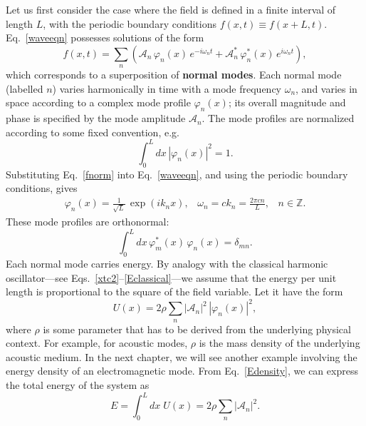 \documentclass[prx,12pt]{revtex4-2}
\begin{document}
Let us first consider the case where the field is defined in a finite
interval of length $L$, with the periodic boundary conditions $f(x,t)
\equiv f(x+L, t)$.  Eq.~\eqref{waveeqn} possesses solutions of the
form
\begin{equation}
  f(x,t) = \sum_n \left( \mathcal{A}_n\, \varphi_n(x) \, e^{-i\omega_n t}
  + \mathcal{A}_n^*\, \varphi_n^*(x) \, e^{i\omega_n t}\right),
  \label{fnorm}
\end{equation}
which corresponds to a superposition of \textbf{normal modes}.  Each
normal mode (labelled $n$) varies harmonically in time with a mode
frequency $\omega_n$, and varies in space according to a complex mode
profile $\varphi_n(x)$; its overall magnitude and phase is specified
by the mode amplitude $\mathcal{A}_n$.  The mode profiles are
normalized according to some fixed convention, e.g.
\begin{equation}
  \int_0^L dx \, |\varphi_n(x)|^2 = 1.
\end{equation}
Substituting Eq.~\eqref{fnorm} into Eq.~\eqref{waveeqn}, and using the
periodic boundary conditions, gives
\begin{align}
  \varphi_n(x) = \frac{1}{\sqrt{L}}\, \exp\left(ik_n x\right), \;\;\;
  \omega_n = c k_n = \frac{2\pi c n}{L}, \;\;\; n \in \mathbb{Z}.
  \label{classical_modes}
\end{align}
These mode profiles are orthonormal:
\begin{equation}
  \int_0^L dx \, \varphi_m^*(x) \, \varphi_n(x) = \delta_{mn}.
\end{equation}
Each normal mode carries energy.  By analogy with the classical
harmonic oscillator---see Eqs.~\eqref{xtc2}--\eqref{Eclassical}---we
assume that the energy per unit length is proportional to the square
of the field variable.  Let it have the form
\begin{equation}
  U(x) = 2 \rho \sum_n|\mathcal{A}_n|^2 \, |\varphi_n(x)|^2,
  \label{Edensity}
\end{equation}
where $\rho$ is some parameter that has to be derived from the
underlying physical context.  For example, for acoustic modes, $\rho$
is the mass density of the underlying acoustic medium.  In the next
chapter, we will see another example involving the energy density of
an electromagnetic mode.  From Eq.~\eqref{Edensity}, we can express
the total energy of the system as
\begin{equation}
  E = \int_0^L dx \; U(x) = 2  \rho \sum_n |\mathcal{A}_n|^2.
  \label{classical_energy}
\end{equation}
\end{document}
